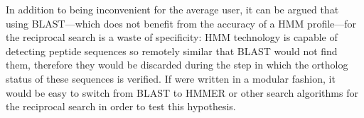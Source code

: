 In addition to \hamstr being inconvenient for the average user, it can be argued
that using BLAST---which does not benefit from the accuracy of a HMM
profile---for the reciprocal search is a waste of specificity: HMM technology is
capable of detecting peptide sequences so remotely similar that BLAST would not
find them, therefore they would be discarded during the step in which the
ortholog status of these sequences is verified. If \hamstr were written in a
modular fashion, it would be easy to switch from BLAST to HMMER or other search
algorithms for the reciprocal search in order to test this hypothesis. 
